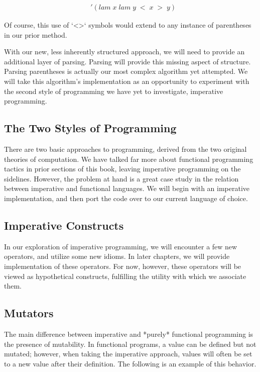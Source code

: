 \begin{align*}
& '(lam \; x \; lam \; y \; < \; x \; > \; y)
\end{align*}

Of course, this use of `<>` symbols would extend to any instance of parentheses 
in our prior method.

With our new, less inherently structured approach, we will need to provide an 
additional layer of parsing. Parsing will provide this missing aspect of structure. 
Parsing parentheses is actually our most complex algorithm yet attempted. We will 
take this algorithm's implementation as an opportunity to experiment with the 
second style of programming we have yet to investigate, imperative programming.

\subsection{The Two Styles of Programming}
There are two basic approaches to programming, derived from the two original 
theories of computation. We have talked far more about functional programming 
tactics in prior sections of this book, leaving imperative programming on the 
sidelines. However, the problem at hand is a great case study in the relation 
between imperative and functional languages. We will begin with an imperative 
implementation, and then port the code over to our current language of choice.

\subsection{Imperative Constructs}
In our exploration of imperative programming, we will encounter a few new operators, 
and utilize some new idioms. In later chapters, we will provide implementation of 
these operators. For now, however, these operators will be viewed as hypothetical 
constructs, fulfilling the utility with which we associate them.

\subsection{Mutators}
The main difference between imperative and *purely* functional programming is the 
presence of mutability. In functional programs, a value can be defined but not 
mutated; however, when taking the imperative approach, values will often be set to 
a new value after their definition. The following is an example of this behavior.


